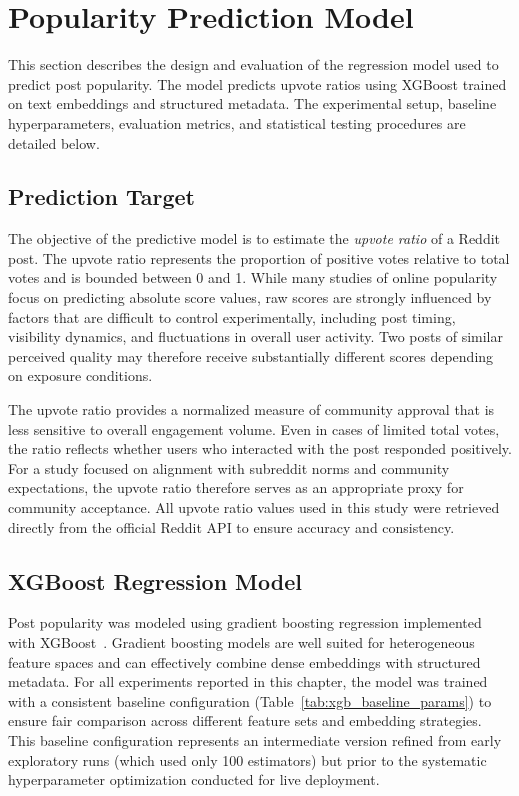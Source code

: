\section{Popularity Prediction Model}

This section describes the design and evaluation of the regression model used to predict post popularity. The model predicts upvote ratios using XGBoost trained on text embeddings and structured metadata. The experimental setup, baseline hyperparameters, evaluation metrics, and statistical testing procedures are detailed below.

\subsection{Prediction Target}

The objective of the predictive model is to estimate the \textit{upvote ratio} of a Reddit post. The upvote ratio represents the proportion of positive votes relative to total votes and is bounded between 0 and 1. While many studies of online popularity focus on predicting absolute score values, raw scores are strongly influenced by factors that are difficult to control experimentally, including post timing, visibility dynamics, and fluctuations in overall user activity. Two posts of similar perceived quality may therefore receive substantially different scores depending on exposure conditions.

The upvote ratio provides a normalized measure of community approval that is less sensitive to overall engagement volume. Even in cases of limited total votes, the ratio reflects whether users who interacted with the post responded positively. For a study focused on alignment with subreddit norms and community expectations, the upvote ratio therefore serves as an appropriate proxy for community acceptance. All upvote ratio values used in this study were retrieved directly from the official Reddit API to ensure accuracy and consistency.

\subsection{XGBoost Regression Model}

Post popularity was modeled using gradient boosting regression implemented with XGBoost~\cite{chen2016xgboost}. Gradient boosting models are well suited for heterogeneous feature spaces and can effectively combine dense embeddings with structured metadata. For all experiments reported in this chapter, the model was trained with a consistent baseline configuration (Table~\ref{tab:xgb_baseline_params}) to ensure fair comparison across different feature sets and embedding strategies. This baseline configuration represents an intermediate version refined from early exploratory runs (which used only 100 estimators) but prior to the systematic hyperparameter optimization conducted for live deployment.

